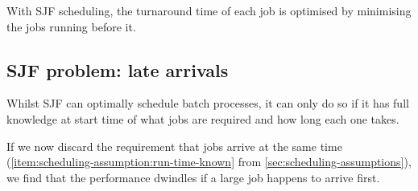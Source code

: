 With SJF scheduling, the turnaround time of each job is optimised by minimising the jobs running before it.

\subsection{SJF problem: late arrivals}

Whilst SJF can optimally schedule batch processes, it can only do so if it has full knowledge at start time of what jobs are required and how long each one takes.

If we now discard the requirement that jobs arrive at the same time (\ref{item:scheduling-assumption:run-time-known} from \autoref{sec:scheduling-assumptions}), we find that the performance dwindles if a large job happens to arrive first.

